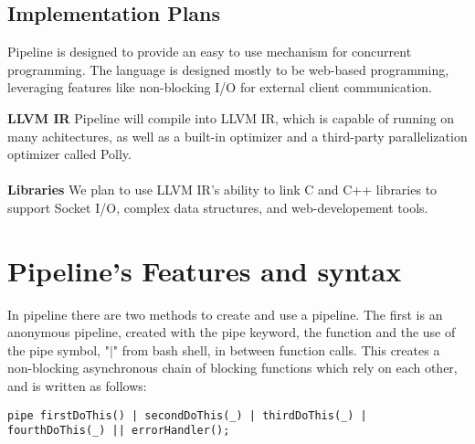 \documentclass[11pt]{article}
\begin{document}
\subsection{Implementation Plans}
\hspace{0.5cm} Pipeline is designed to provide an easy to use mechanism for concurrent programming. The language is designed mostly to be web-based programming, leveraging features like non-blocking I/O for external client communication.

\begin{adjustwidth}{1cm}{}
\textbf{LLVM IR} Pipeline will compile into LLVM IR, which is capable of running on many achitectures, as well as a built-in optimizer
and a third-party parallelization optimizer called Polly.\\ \\
\textbf{Libraries} We plan to use LLVM IR's ability to link C and C++ libraries to support Socket I/O, complex data structures, and web-developement tools.

\end{adjustwidth}


\section{Pipeline's Features and syntax}
\hspace{0.5cm} In pipeline there are two methods to create and use a pipeline. The first is an anonymous pipeline, created with the pipe keyword, the function and the use of the pipe symbol, "$\vert$" from 
bash shell, in between function calls. This creates a non-blocking asynchronous chain of blocking functions which rely on each other, and is written as follows:

\begin{lstlisting}
pipe firstDoThis() | secondDoThis(_) | thirdDoThis(_) | fourthDoThis(_) || errorHandler();
\end{lstlisting}
\end{document}
